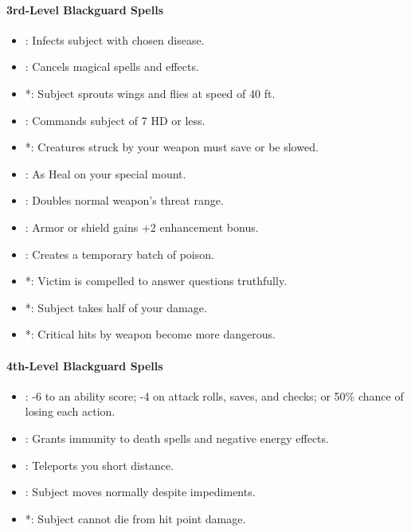 \paragraph{3rd-Level Blackguard Spells}
\begin{itemize}
 \item {}: Infects subject with chosen disease. %
 \item {}: Cancels magical spells and effects.
 \item {}*: Subject sprouts wings and flies at speed of 40 ft. %
 \item {}: Commands subject of 7 HD or less.
 \item {}*: Creatures struck by your weapon must save or be slowed. %
 \item {}: As Heal on your special mount.
 \item {}: Doubles normal weapon's threat range.
 \item {}: Armor or shield gains +2 enhancement bonus.
 \item {}: Creates a temporary batch of poison. %
 \item {}*: Victim is compelled to answer questions truthfully. %
 \item {}*: Subject takes half of your damage.
 \item {}*: Critical hits by weapon become more dangerous. %
\end{itemize}
\paragraph{4th-Level Blackguard Spells}
\begin{itemize}
 \item {}: -6 to an ability score; -4 on attack rolls, saves, and checks; or 50\% chance of losing each action. %
 \item {}: Grants immunity to death spells and negative energy effects.
 \item {}: Teleports you short distance.
 \item {}: Subject moves normally despite impediments.
 \item {}*: Subject cannot die from hit point damage.
\end{itemize}
